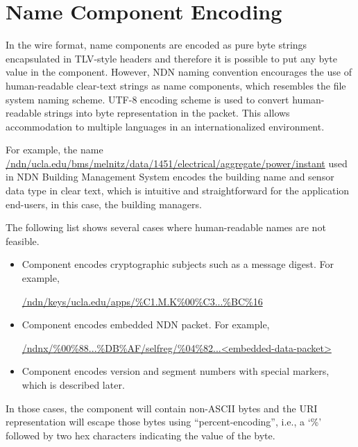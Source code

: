 \section{Name Component Encoding}

In the wire format, name components are encoded as pure byte strings encapsulated in TLV-style headers and therefore it is possible to put any byte value in the component. However, NDN naming convention encourages the use of human-readable clear-text strings as name components, which resembles the file system naming scheme. UTF-8 encoding scheme is used to convert human-readable strings into byte representation in the packet. This allows accommodation to multiple languages in an internationalized environment.

For example, the name \url{/ndn/ucla.edu/bms/melnitz/data/1451/electrical/aggregate/power/instant} used in NDN Building Management System encodes the building name and sensor data type in clear text, which is intuitive and straightforward for the application end-users, in this case, the building managers.

The following list shows several cases where human-readable names are not feasible.

\begin{itemize}
\item Component encodes cryptographic subjects such as a message digest. For example,

\begin{center}
\url{/ndn/keys/ucla.edu/apps/\%C1.M.K\%00\%C3...\%BC\%16}
\end{center}

\item Component encodes embedded NDN packet. For example,

\begin{center}
\url{/ndnx/\%00\%88...\%DB\%AF/selfreg/\%04\%82...<embedded-data-packet>}
\end{center}

\item Component encodes version and segment numbers with special markers, which is described later.
\end{itemize}

In those cases, the component will contain non-ASCII bytes and the URI representation will escape those bytes using ``percent-encoding'', i.e., a `\%' followed by two hex characters indicating the value of the byte.


